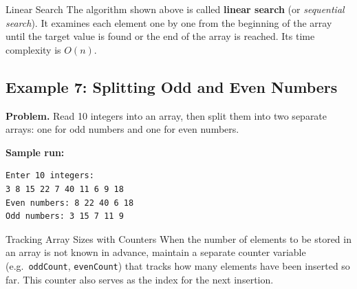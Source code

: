 \begin{conceptbox}{Linear Search}
The algorithm shown above is called \textbf{linear search} (or
\emph{sequential search}). It examines each element one by one from the
beginning of the array until the target value is found or the end of the
array is reached. Its time complexity is $O(n)$.
\end{conceptbox}

\subsection{Example 7: Splitting Odd and Even Numbers}

\textbf{Problem.} Read 10 integers into an array, then split them into
two separate arrays: one for odd numbers and one for even numbers.


\textbf{Sample run:}
\begin{verbatim}
Enter 10 integers:
3 8 15 22 7 40 11 6 9 18
Even numbers: 8 22 40 6 18
Odd numbers: 3 15 7 11 9
\end{verbatim}

\begin{importantbox}{Tracking Array Sizes with Counters}
When the number of elements to be stored in an array is not known in
advance, maintain a separate counter variable (e.g.\ \texttt{oddCount},
\texttt{evenCount}) that tracks how many elements have been inserted so
far. This counter also serves as the index for the next insertion.
\end{importantbox}
